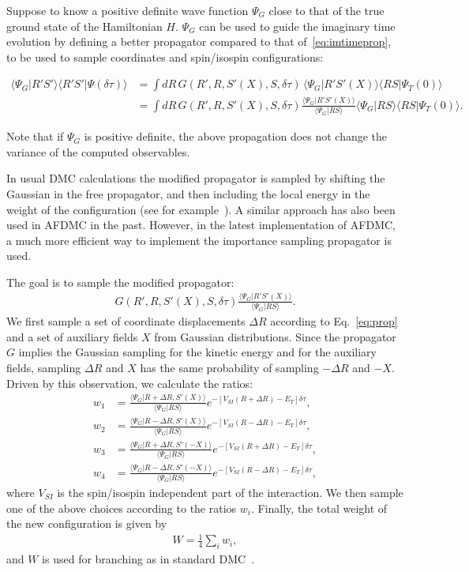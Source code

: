 \documentclass[aps,prc,twocolumn,superscriptaddress,floatfix]{revtex4-1}
\newcommand{\red}[1]{\protect\textcolor{red}{#1}}
\begin{document}
Suppose to know a positive definite wave function $\Psi_G$ close to that of the true ground state of
the Hamiltonian $H$. $\Psi_G$ can be used to guide the imaginary time evolution by defining a
better propagator compared to that of~\cref{eq:imtimeprop}, to be used to sample coordinates and 
spin/isospin configurations:
\begin{widetext}
\begin{align}
\langle\Psi_G|R'S'\rangle\langle R'S'|\Psi(\delta\tau)\rangle
&=\displaystyle\int dR\,G(R',R,S'(X),S,\delta\tau)\,\langle\Psi_G|R'S'(X)\rangle\langle RS|\Psi_T(0)\rangle
\nonumber \\
&=\displaystyle\int dR\,G(R',R,S'(X),S,\delta\tau)\frac{\langle\Psi_G|R'S'(X)\rangle}{\langle\Psi_G|RS\rangle}
\langle\Psi_G|RS\rangle\langle RS|\Psi_T(0)\rangle .
\end{align}
\end{widetext}
Note that if $\Psi_G$ is positive definite, the above propagation does not change the 
variance of the computed observables.

In usual DMC calculations the modified propagator is sampled by shifting the Gaussian in
the free propagator, and then including the local energy in the weight of the configuration
(see for example~\red{\cite{XXX}}). A similar approach has also been used in AFDMC in the past. 
However, in the latest implementation of AFDMC, a much more efficient way to implement the
importance sampling propagator is used.

The goal is to sample the modified propagator:
\begin{align}
G(R',R,S'(X),S,\delta\tau)\frac{\langle\Psi_G|R'S'(X)\rangle}{\langle\Psi_G|RS\rangle} .
\end{align}
We first sample a set of coordinate displacements $\Delta R$ according
to Eq.~\ref{eq:prop} and a
set of auxiliary fields $X$ from Gaussian distributions.
Since the propagator $G$ implies the Gaussian sampling for the kinetic energy and 
for the auxiliary fields, sampling $\Delta R$ and $X$ has the same probability
of sampling $-\Delta R$ and $-X$.
Driven by this observation, we calculate the ratios:
\begin{align}
w_1&=\frac{\langle\Psi_G|R+\Delta R,S'(X)\rangle}{\langle\Psi_G|RS\rangle}e^{-[V_{SI}(R+\Delta R)-E_T]\delta\tau},
\nonumber \\
w_2&=\frac{\langle\Psi_G|R-\Delta R,S'(X)\rangle}{\langle\Psi_G|RS\rangle}e^{-[V_{SI}(R-\Delta R)-E_T]\delta\tau},
\nonumber \\
w_3&=\frac{\langle\Psi_G|R+\Delta R,S'(-X)\rangle}{\langle\Psi_G|RS\rangle}e^{-[V_{SI}(R+\Delta R)-E_T]\delta\tau},
\nonumber \\
w_4&=\frac{\langle\Psi_G|R-\Delta R,S'(-X)\rangle}{\langle\Psi_G|RS\rangle}e^{-[V_{SI}(R-\Delta R)-E_T]\delta\tau},
\label{eq:w_i}
\end{align}
where $V_{SI}$ is the spin/isospin independent part of the interaction.
We then sample one of the above choices according to the ratios $w_i$.
Finally, the total weight of the new configuration is given by
\begin{align}
W=\frac{1}{4}\sum_i w_i ,
\end{align}
and $W$ is used for branching as in standard DMC~\cite{Carlson:2015}.
\end{document}
